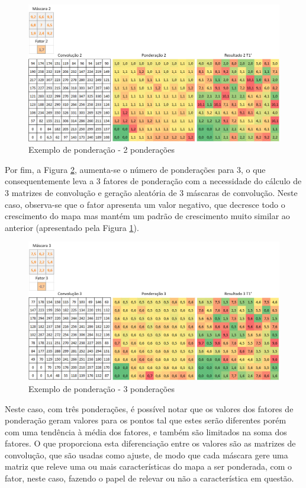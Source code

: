 \begin{figure}[h]
	\centering	\includegraphics[scale=0.6]{Figuras/PonderationsExample-2Ponderations.png}
	\caption{Exemplo de ponderação - 2 ponderações}
	\label{fig:TwoPondertion}
\end{figure}
 
	Por fim, a Figura \ref{fig:TreePondertion}, aumenta-se o número de ponderações para 3, o que consequentemente leva a 3 fatores de ponderação com a necessidade do cálculo de 3 matrizes de convolução e geração aleatória de 3 máscaras de convolução. Neste caso, observa-se que o fator apresenta um valor negativo, que decresce todo o crescimento do mapa mas mantém um padrão de crescimento muito similar ao anterior (apresentado pela Figura \ref{fig:TwoPondertion}). 
    
\begin{figure}[h]
	\centering	\includegraphics[scale=0.6]{Figuras/PonderationsExample-3Ponderations.png}
	\caption{Exemplo de ponderação - 3 ponderações}
	\label{fig:TreePondertion}
\end{figure}

Neste caso, com três ponderações, é possível notar que os valores dos fatores de ponderação geram valores para os pontos tal que estes serão diferentes porém com uma tendência à média dos fatores, e também são limitados na soma dos fatores. O que proporciona esta diferenciação entre os valores são as matrizes de convolução, que são usadas como ajuste, de modo que cada máscara gere uma matriz que releve uma ou mais características do mapa a ser ponderada, com o fator, neste caso, fazendo o papel de relevar ou não a característica em questão. 

